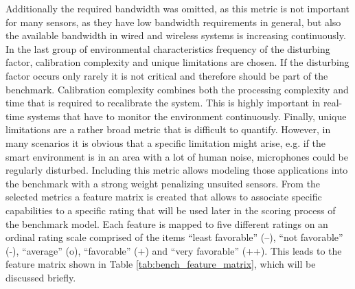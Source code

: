 Additionally the required bandwidth was omitted, as this metric is not important for many sensors, as they have low bandwidth requirements in general, but also the available bandwidth in wired and wireless systems is increasing continuously. In the last group of environmental characteristics frequency of the disturbing factor, calibration complexity and unique limitations are chosen. If the disturbing factor occurs only rarely it is not critical and therefore should be part of the benchmark. Calibration complexity combines both the processing complexity and time that is required to recalibrate the system. This is highly important in real-time systems that have to monitor the environment continuously. Finally, unique limitations are a rather broad metric that is difficult to quantify. However, in many scenarios it is obvious that a specific limitation might arise, e.g. if the smart environment is in an area with a lot of human noise, microphones could be regularly disturbed. Including this metric allows modeling those applications into the benchmark with a strong weight penalizing unsuited sensors. From the selected metrics a feature matrix is created that allows  to associate specific capabilities to a specific rating that will be used later in the scoring process of the benchmark model. Each feature is mapped to five different ratings on an ordinal rating scale comprised of the items “least favorable” (--), “not favorable” (-), “average” (o), “favorable” (+) and “very favorable” (++). This leads to the feature matrix shown in Table \ref{tab:bench_feature_matrix}, which will be discussed briefly.
